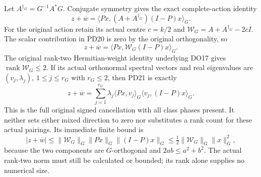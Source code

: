 \documentclass[11pt]{article}
\newcommand{\rank}{\operatorname{rank}}
\begin{document}
Let $A^{\dagger_G}=G^{-1}A^*G$.  Conjugate symmetry gives the exact
complete-action identity
\[
 \boxed{z+\overline w
       =\langle Px,(A+A^{\dagger_G})(I-P)x\rangle_G.}            \tag{PD20}
\]
For the original action retain its actual centre $c=k/2$ and
$\mathcal W_G=A+A^{\dagger_G}-2cI$.  The scalar contribution in
PD20 is zero by the original orthogonality, so
\[
 z+\overline w=\langle Px,\mathcal W_G(I-P)x\rangle_G.           \tag{PD21}
\]
The original rank-two Hermitian-weight identity underlying DO17 \cite{DO}
gives $\rank\mathcal W_G\le2$.  If its actual orthonormal spectral
vectors and real eigenvalues are $(v_j,\lambda_j)$, $1\le j\le r_G$
with $r_G\le2$, then PD21 is exactly
\[
 z+\overline w
   =\sum_{j=1}^{r_G}\lambda_j
       \langle Px,v_j\rangle_G\langle v_j,(I-P)x\rangle_G.        \tag{PD22}
\]
This is the full original signed cancellation with all class phases
present.  It neither sets either mixed direction to zero nor
substitutes a rank count for these actual pairings.  Its immediate
finite bound is
\[
 |z+\overline w|
 \le\|\mathcal W_G\|_G\|Px\|_G\|(I-P)x\|_G
 \le\tfrac12\|\mathcal W_G\|_G\|x\|_G^2,                      \tag{PD23}
\]
because the two components are $G$-orthogonal and
$2ab\le a^2+b^2$.  The actual rank-two norm must still be
calculated or bounded; its rank alone supplies no numerical size.
\end{document}
